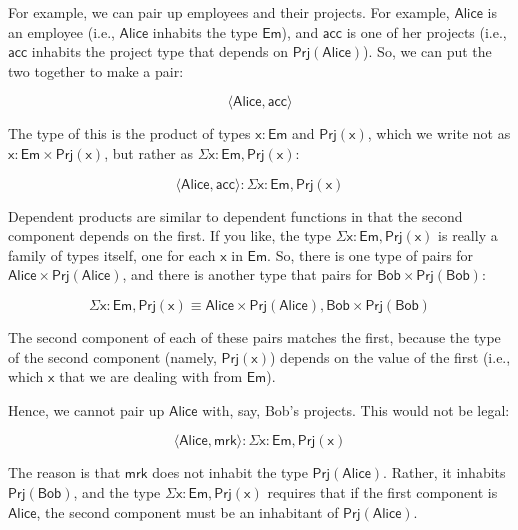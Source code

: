 \documentclass{article}
\newcommand\term{\mathsf}
\def\SigmaBinder/{\Sigma}
\newcommand\depprod[3]{\term{\SigmaBinder/ #1 : #2, #3}}
\def\pairSymbol/{\times}
\newcommand\pair[2]{\term{\langle #1, #2 \rangle}}
\begin{document}
For example, we can pair up employees and their projects. For example, $\term{Alice}$ is an employee (i.e., $\term{Alice}$ inhabits the type $\term{Em}$), and $\term{acc}$ is one of her projects (i.e., $\term{acc}$ inhabits the project type that depends on $\term{Prj(Alice)}$). So, we can put the two together to make a pair:

\begin{equation*}
  \pair{\term{Alice}}{\term{acc}}
\end{equation*}

The type of this is the product of types $\term{x} : \term{Em}$ and $\term{Prj(x)}$, which we write not as $\term{x : Em \pairSymbol/ Prj(x)}$, but rather as $\depprod{x}{Em}{Prj(x)}$:

\begin{equation*}
  \pair{\term{Alice}}{\term{acc}} : \depprod{x}{Em}{Prj(x)}
\end{equation*}

Dependent products are similar to dependent functions in that the second component depends on the first. If you like, the type $\depprod{x}{Em}{Prj(x)}$ is really a family of types itself, one for each $\term{x}$ in $\term{Em}$. So, there is one type of pairs for $\term{Alice} \pairSymbol/ \term{Prj(Alice)}$, and there is another type that pairs for $\term{Bob} \pairSymbol/ \term{Prj(Bob)}$:

\begin{equation*}
  \depprod{x}{Em}{Prj(x)} \equiv \term{Alice} \pairSymbol/ \term{Prj(Alice)}, \term{Bob} \pairSymbol/ \term{Prj(Bob)}
\end{equation*}

The second component of each of these pairs matches the first, because the type of the second component (namely, $\term{Prj(x)}$) depends on the value of the first (i.e., which $\term{x}$ that we are dealing with from $\term{Em}$). 

Hence, we cannot pair up $\term{Alice}$ with, say, Bob's projects. This would not be legal:

\begin{equation*}
  \pair{\term{Alice}}{\term{mrk}} : \depprod{x}{Em}{Prj(x)}
\end{equation*}

The reason is that $\term{mrk}$ does not inhabit the type $\term{Prj(Alice)}$. Rather, it inhabits $\term{Prj(Bob)}$, and the type $\depprod{x}{Em}{Prj(x)}$ requires that if the first component is $\term{Alice}$, the second component must be an inhabitant of $\term{Prj(Alice)}$.
\end{document}
